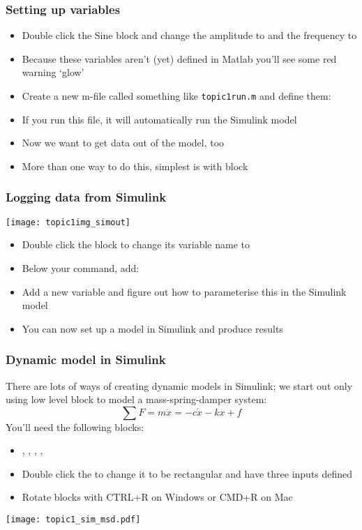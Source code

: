 \documentclass[9pt]{beamer-control}
\begin{document}
\begin{frame}
\frametitle{Setting up variables}
\begin{itemize}
\item
Double click the Sine block and change the amplitude to  and the frequency to 
\item
Because these variables aren't (yet) defined in Matlab you'll see some red warning `glow'
\item
Create a new m-file called something like \texttt{topic1run.m} and define them:
\end{itemize}
\begin{itemize}
\item
If you run this file, it will automatically run the Simulink model
\item
Now we want to get data out of the model, too
\item
More than one way to do this, simplest is with  block
\end{itemize}

\end{frame}

\begin{frame}
\frametitle{Logging data from Simulink}
\centering
\texttt{[image: topic1img\_simout]}
\begin{itemize}
\item
Double click the  block to change its variable name to 
\item
Below your  command, add:
\end{itemize}
\begin{itemize}
\item
Add a new variable  and figure out how to parameterise this in the Simulink model
\item
You can now set up a model in Simulink and produce results
\end{itemize}

\end{frame}


\begin{frame}
\frametitle{Dynamic model in Simulink}
There are lots of ways of creating dynamic models in Simulink; we start out only using low level block to model a mass-spring-damper system:
\[
   \sum F = m\ddot x = - c\dot x - kx + f
\]
You'll need the following blocks:
\begin{itemize}
\item {}, , , , 
\item Double click the  to change it to be rectangular and have three inputs defined \CODE{+--}
\item Rotate blocks with CTRL+R on Windows or CMD+R on Mac
\end{itemize}

\centering
\texttt{[image: topic1\_sim\_msd.pdf]}

\end{frame}
\end{document}
